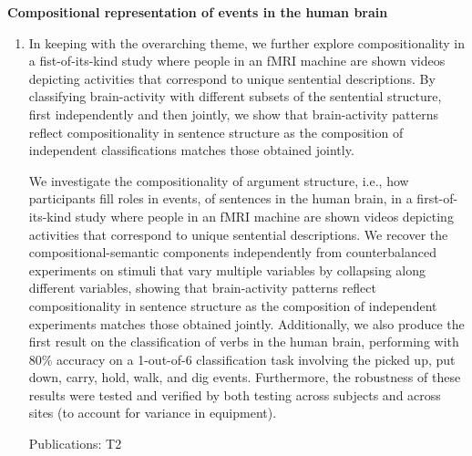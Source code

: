\documentclass[10pt]{article}
\newenvironment{researchBlock}[1]{%
  \vspace*{0.5ex}
  {\large \textbf{#1}}
  \begin{enumerate}\item[]}
  {\end{enumerate}}
\newcommand{\refr}[1]{{\color{RoyalBlue} #1}}
\begin{document}
\begin{researchBlock} {Compositional representation of events in the human brain}

  In keeping with the overarching theme, we further explore compositionality in
  a fist-of-its-kind study where people in an fMRI machine are shown videos
  depicting activities that correspond to unique sentential descriptions. By
  classifying brain-activity with different subsets of the sentential
  structure, first independently and then jointly, we show that brain-activity
  patterns reflect compositionality in sentence structure as the composition of
  independent classifications matches those obtained jointly.

  We investigate the compositionality of argument structure, i.e., how
  participants fill roles in events, of sentences in the human brain, in a
  first-of-its-kind study where people in an fMRI machine are shown videos
  depicting activities that correspond to unique sentential descriptions.
  We recover the compositional-semantic components independently from
  counterbalanced experiments on stimuli that vary multiple variables by
  collapsing along different variables, showing that brain-activity patterns
  reflect compositionality in sentence structure as the composition of
  independent experiments matches those obtained jointly.
  Additionally, we also produce the first result on the classification of verbs
  in the human brain, performing with 80\% accuracy on a 1-out-of-6
  classification task involving the picked up, put down, carry, hold, walk, and
  dig events.
  Furthermore, the robustness of these results were tested and verified by both
  testing across subjects and across sites (to account for variance in
  equipment).

  Publications: \refr{T2}
\end{researchBlock}
\end{document}
